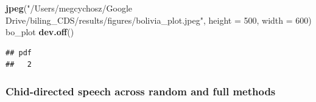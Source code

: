 \documentclass[
]{article}
\newenvironment{Shaded}{\begin{snugshade}}{\end{snugshade}}
\newcommand{\DataTypeTok}[1]{\textcolor[rgb]{0.13,0.29,0.53}{#1}}
\newcommand{\DecValTok}[1]{\textcolor[rgb]{0.00,0.00,0.81}{#1}}
\newcommand{\KeywordTok}[1]{\textcolor[rgb]{0.13,0.29,0.53}{\textbf{#1}}}
\newcommand{\NormalTok}[1]{#1}
\newcommand{\StringTok}[1]{\textcolor[rgb]{0.31,0.60,0.02}{#1}}
\begin{document}
\begin{Shaded}
\begin{Highlighting}[]
\KeywordTok{jpeg}\NormalTok{(}\StringTok{"/Users/megcychosz/Google Drive/biling_CDS/results/figures/bolivia_plot.jpeg"}\NormalTok{, }\DataTypeTok{height =} \DecValTok{500}\NormalTok{, }\DataTypeTok{width =} \DecValTok{600}\NormalTok{)}
\NormalTok{bo_plot}
\KeywordTok{dev.off}\NormalTok{()}
\end{Highlighting}
\end{Shaded}

\begin{verbatim}
## pdf 
##   2
\end{verbatim}

\hypertarget{chid-directed-speech-across-random-and-full-methods}{%
\subsubsection{Chid-directed speech across random and full methods}\label{chid-directed-speech-across-random-and-full-methods}}
\end{document}
